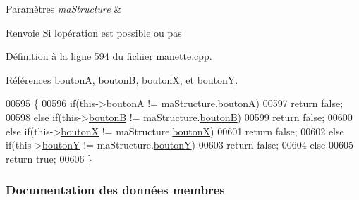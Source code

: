 \begin{DoxyParams}{Paramètres}
{\em ma\+Structure} & \\
\hline
\end{DoxyParams}
\begin{DoxyReturn}{Renvoie}
Si l\textquotesingle{}opération est possible ou pas 
\end{DoxyReturn}


Définition à la ligne \hyperlink{manette_8cpp_source_l00594}{594} du fichier \hyperlink{manette_8cpp_source}{manette.\+cpp}.



Références \hyperlink{manette_8h_source_l00124}{boutonA}, \hyperlink{manette_8h_source_l00125}{boutonB}, \hyperlink{manette_8h_source_l00126}{boutonX}, et \hyperlink{manette_8h_source_l00127}{boutonY}.


\begin{DoxyCode}
00595 \{
00596     \textcolor{keywordflow}{if}(this->\hyperlink{struct_etat_manette_bouton_a0a1bcb57b5ce1a3f4ff6de5e8749c052}{boutonA} != maStructure.\hyperlink{struct_etat_manette_bouton_a0a1bcb57b5ce1a3f4ff6de5e8749c052}{boutonA})
00597         \textcolor{keywordflow}{return} \textcolor{keyword}{false};
00598     \textcolor{keywordflow}{else} \textcolor{keywordflow}{if}(this->\hyperlink{struct_etat_manette_bouton_a2a0f4d809b1b9b814fa689113becaad7}{boutonB} != maStructure.\hyperlink{struct_etat_manette_bouton_a2a0f4d809b1b9b814fa689113becaad7}{boutonB})
00599         \textcolor{keywordflow}{return} \textcolor{keyword}{false};
00600     \textcolor{keywordflow}{else} \textcolor{keywordflow}{if}(this->\hyperlink{struct_etat_manette_bouton_a4a1d74300413624fd13841eb11c6e974}{boutonX} != maStructure.\hyperlink{struct_etat_manette_bouton_a4a1d74300413624fd13841eb11c6e974}{boutonX})
00601         \textcolor{keywordflow}{return} \textcolor{keyword}{false};
00602     \textcolor{keywordflow}{else} \textcolor{keywordflow}{if}(this->\hyperlink{struct_etat_manette_bouton_aae061f9e32f970787226ef9e0bdb5a17}{boutonY} != maStructure.\hyperlink{struct_etat_manette_bouton_aae061f9e32f970787226ef9e0bdb5a17}{boutonY})
00603         \textcolor{keywordflow}{return} \textcolor{keyword}{false};
00604     \textcolor{keywordflow}{else}
00605         \textcolor{keywordflow}{return} \textcolor{keyword}{true};
00606 \}
\end{DoxyCode}


\subsubsection{Documentation des données membres}
\mbox{\label{struct_etat_manette_bouton_a0a1bcb57b5ce1a3f4ff6de5e8749c052}} 
